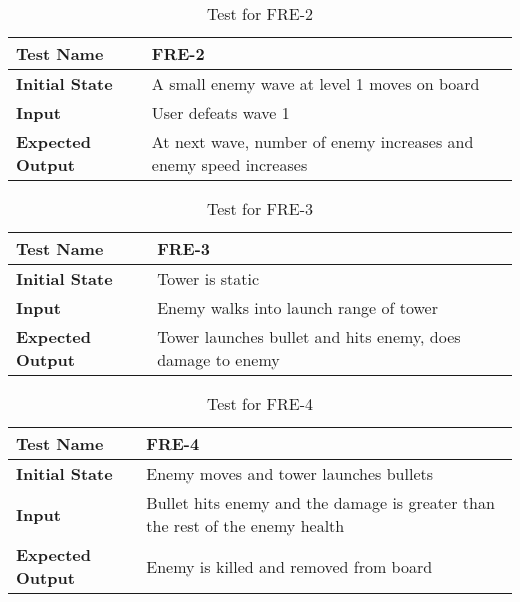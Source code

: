 \documentclass[12,english]{article}
\begin{document}
        \begin{table}[h!]
        	\begin{tabular}[r]{|l|l|}
        	    \hline
        		\textbf{Test Name} & FRE-2 \\ 
        		\hline
        		\textbf{Initial State} & A small enemy wave at level 1 moves on board\\ 
        		\hline
        		\textbf{Input} & User defeats wave 1 \\ 
        		\hline 
        		\textbf{Expected Output} & At next wave, number of enemy increases and enemy speed increases\\ 
        		\hline
        	\end{tabular}
        	\caption{Test for FRE-2}
        	\label{Table}
        \end{table}
        
        \begin{table}[h!]
        	\begin{tabular}[r]{|l|l|}
        	    \hline
        		\textbf{Test Name} & FRE-3 \\ 
        		\hline
        		\textbf{Initial State} & Tower is static\\ 
        		\hline
        		\textbf{Input} & Enemy walks into launch range of tower\\ 
        		\hline 
        		\textbf{Expected Output} & Tower launches bullet and hits enemy, does damage to enemy\\ 
        		\hline
        	\end{tabular}
        	\caption{Test for FRE-3}
        	\label{Table}
        \end{table}
        
        \begin{table}[h!]
        	\begin{tabular}[r]{|l|l|}
        	    \hline
        		\textbf{Test Name} & FRE-4 \\ 
        		\hline
        		\textbf{Initial State} & Enemy moves and tower launches bullets\\ 
        		\hline
        		\textbf{Input} & Bullet hits enemy and the damage is greater than the rest of the enemy health\\ 
        		\hline 
        		\textbf{Expected Output} & Enemy is killed and removed from board\\ 
        		\hline
        	\end{tabular}
        	\caption{Test for FRE-4}
        	\label{Table}
        \end{table}
\end{document}
